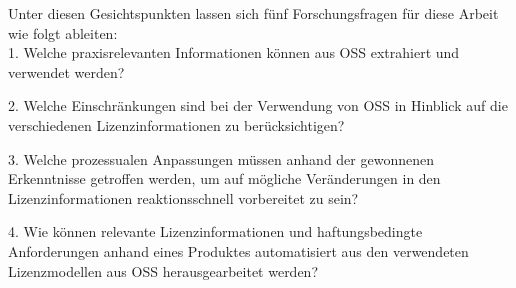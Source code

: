 Unter diesen Gesichtspunkten lassen sich fünf Forschungsfragen für diese Arbeit wie folgt ableiten:\\ 

1. Welche praxisrelevanten Informationen können aus OSS extrahiert und verwendet werden?



2. Welche Einschränkungen sind bei der Verwendung von OSS in Hinblick auf die verschiedenen Lizenzinformationen zu berücksichtigen? 



3. Welche prozessualen Anpassungen müssen anhand der gewonnenen Erkenntnisse getroffen werden, um auf mögliche Veränderungen in den Lizenzinformationen reaktionsschnell vorbereitet zu sein? 








4. Wie können relevante Lizenzinformationen und haftungsbedingte Anforderungen anhand eines Produktes automatisiert aus den verwendeten Lizenzmodellen aus OSS herausgearbeitet werden? 

